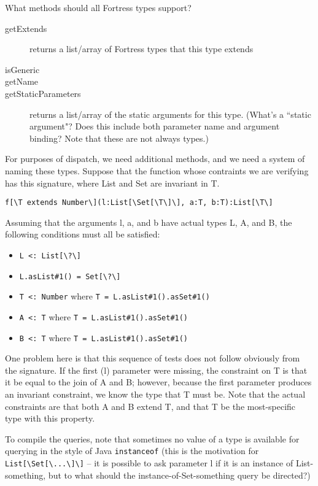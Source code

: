 \documentclass[11pt]{article}
\begin{document}
What methods should all Fortress types support?
\begin{description}
\item[getExtends] returns a list/array of Fortress types that this type extends
\item[isGeneric] 
\item[getName] 
\item[getStaticParameters] returns a list/array of the static arguments for this type.  (What's a ``static argument"?  Does this include both parameter name and argument binding?  Note that these are not always types.)
\end{description}

For purposes of dispatch, we need additional methods, and we need a system of naming these types.  Suppose that the function whose contraints we are verifying has this signature, where List and Set are invariant in T.
\begin{verbatim}
f[\T extends Number\](l:List[\Set[\T\]\], a:T, b:T):List[\T\]
\end{verbatim}
Assuming that the arguments l, a, and b have actual types L, A, and B, the following conditions must all be satisfied:
\begin{itemize}
\item \verb+L <: List[\?\]+
\item \verb+L.asList#1() = Set[\?\]+
\item \verb+T <: Number+ where \verb+T = L.asList#1().asSet#1()+
\item \verb+A <: T+ where \verb+T = L.asList#1().asSet#1()+
\item \verb+B <: T+ where \verb+T = L.asList#1().asSet#1()+
\end{itemize}
One problem here is that this sequence of tests does not follow obviously from the signature.
If the first (l) parameter were missing, the constraint on T is that it be equal to the join of A and B; however, because the first parameter produces an invariant constraint, we know the type that T must be.  Note that the actual constraints are that both A and B extend T, and that T be the most-specific type with this property.

To compile the queries, note that sometimes no value of a type is available for querying in the style of Java \verb+instanceof+ (this is the motivation for \verb+List[\Set[\...\]\]+ -- it is possible to ask parameter l if it is an instance of List-something, but to what should the instance-of-Set-something query be directed?)
\end{document}
